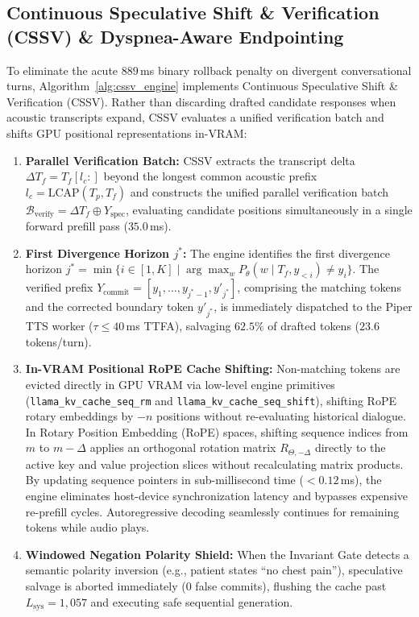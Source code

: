 \documentclass[10pt,journal,compsoc]{IEEEtran}
\begin{document}
\subsection{Continuous Speculative Shift \& Verification (CSSV) \& Dyspnea-Aware Endpointing}
To eliminate the acute $889$\,ms binary rollback penalty on divergent conversational turns, Algorithm~\ref{alg:cssv_engine} implements Continuous Speculative Shift \& Verification (CSSV). Rather than discarding drafted candidate responses when acoustic transcripts expand, CSSV evaluates a unified verification batch and shifts GPU
positional representations in-VRAM:
\begin{enumerate}
    \item \textbf{Parallel Verification Batch:} CSSV extracts the transcript delta $\Delta T_f = T_f[l_c:]$ beyond the longest common acoustic prefix $l_c = \text{LCAP}(T_p, T_f)$ and constructs the unified parallel verification batch $\mathcal{B}_{\text{verify}} = \Delta T_f \oplus Y_{\text{spec}}$, evaluating candidate positions simultaneously in a single forward prefill pass ($35.0$\,ms).
    \item \textbf{First Divergence Horizon $j^*$:} The engine identifies the first divergence horizon $j^* = \min \{ i \in [1, K] \mid \arg\max_{w} P_\theta(w \mid T_f, y_{<i}) \neq y_i \}$. The verified prefix $Y_{\text{commit}} = [y_1, \dots, y_{j^*-1}, y'_{j^*}]$, comprising the matching tokens and the corrected boundary token $y'_{j^*}$, is immediately dispatched to the Piper TTS worker ($\tau \le 40$\,ms TTFA), salvaging $62.5\%$ of drafted tokens ($23.6$ tokens/turn).
    \item \textbf{In-VRAM Positional RoPE Cache Shifting:} Non-matching tokens are evicted directly in GPU VRAM via low-level engine primitives (\texttt{llama\_kv\_cache\_seq\_rm} and \texttt{llama\_kv\_cache\_seq\_shift}), shifting RoPE rotary embeddings by $-n$ positions without re-evaluating historical dialogue. In Rotary Position Embedding (RoPE) spaces, shifting sequence indices from $m$ to $m - \Delta$ applies an orthogonal rotation matrix $R_{\Theta, -\Delta}$ directly to the active key and value projection slices without recalculating matrix products. By updating sequence pointers in sub-millisecond time ($<0.12$\,ms), the engine eliminates host-device synchronization latency and bypasses expensive re-prefill cycles. Autoregressive decoding seamlessly continues for remaining tokens while audio plays.
    \item \textbf{Windowed Negation Polarity Shield:} When the Invariant Gate detects a semantic polarity inversion (e.g., patient states ``no chest pain''), speculative salvage is aborted immediately ($0$ false commits), flushing the cache past $L_{\text{sys}} = 1{,}057$ and executing safe sequential generation.

\end{enumerate}
\end{document}
